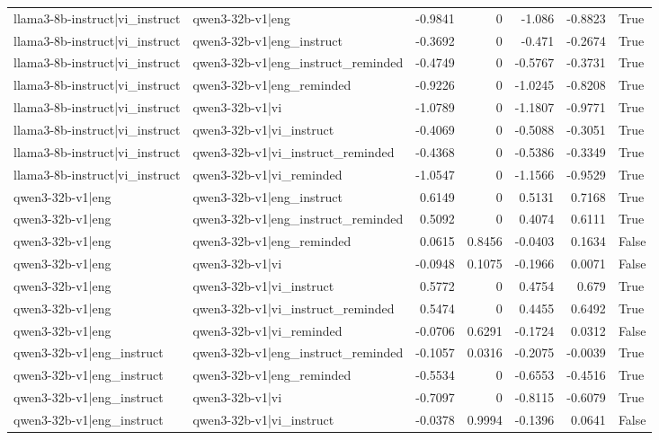 \begin{table}
\begin{tabular}{l l r r r r l}
llama3-8b-instruct|vi_instruct & qwen3-32b-v1|eng & -0.9841 & 0 & -1.086 & -0.8823 & True \\
llama3-8b-instruct|vi_instruct & qwen3-32b-v1|eng_instruct & -0.3692 & 0 & -0.471 & -0.2674 & True \\
llama3-8b-instruct|vi_instruct & qwen3-32b-v1|eng_instruct_reminded & -0.4749 & 0 & -0.5767 & -0.3731 & True \\
llama3-8b-instruct|vi_instruct & qwen3-32b-v1|eng_reminded & -0.9226 & 0 & -1.0245 & -0.8208 & True \\
llama3-8b-instruct|vi_instruct & qwen3-32b-v1|vi & -1.0789 & 0 & -1.1807 & -0.9771 & True \\
llama3-8b-instruct|vi_instruct & qwen3-32b-v1|vi_instruct & -0.4069 & 0 & -0.5088 & -0.3051 & True \\
llama3-8b-instruct|vi_instruct & qwen3-32b-v1|vi_instruct_reminded & -0.4368 & 0 & -0.5386 & -0.3349 & True \\
llama3-8b-instruct|vi_instruct & qwen3-32b-v1|vi_reminded & -1.0547 & 0 & -1.1566 & -0.9529 & True \\
qwen3-32b-v1|eng & qwen3-32b-v1|eng_instruct & 0.6149 & 0 & 0.5131 & 0.7168 & True \\
qwen3-32b-v1|eng & qwen3-32b-v1|eng_instruct_reminded & 0.5092 & 0 & 0.4074 & 0.6111 & True \\
qwen3-32b-v1|eng & qwen3-32b-v1|eng_reminded & 0.0615 & 0.8456 & -0.0403 & 0.1634 & False \\
qwen3-32b-v1|eng & qwen3-32b-v1|vi & -0.0948 & 0.1075 & -0.1966 & 0.0071 & False \\
qwen3-32b-v1|eng & qwen3-32b-v1|vi_instruct & 0.5772 & 0 & 0.4754 & 0.679 & True \\
qwen3-32b-v1|eng & qwen3-32b-v1|vi_instruct_reminded & 0.5474 & 0 & 0.4455 & 0.6492 & True \\
qwen3-32b-v1|eng & qwen3-32b-v1|vi_reminded & -0.0706 & 0.6291 & -0.1724 & 0.0312 & False \\
qwen3-32b-v1|eng_instruct & qwen3-32b-v1|eng_instruct_reminded & -0.1057 & 0.0316 & -0.2075 & -0.0039 & True \\
qwen3-32b-v1|eng_instruct & qwen3-32b-v1|eng_reminded & -0.5534 & 0 & -0.6553 & -0.4516 & True \\
qwen3-32b-v1|eng_instruct & qwen3-32b-v1|vi & -0.7097 & 0 & -0.8115 & -0.6079 & True \\
qwen3-32b-v1|eng_instruct & qwen3-32b-v1|vi_instruct & -0.0378 & 0.9994 & -0.1396 & 0.0641 & False \\

\end{tabular}
\end{table}
